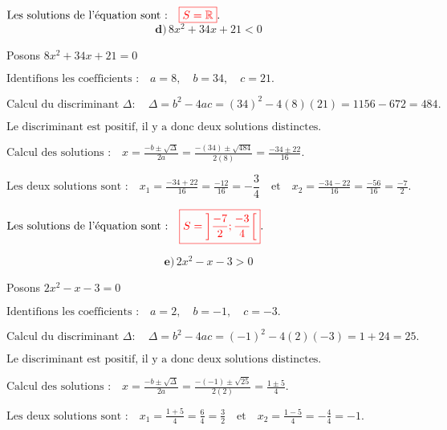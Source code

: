 \documentclass[12pt,a4paper]{article}
\begin{document}
\(
\text{Les solutions de l'équation sont :} \quad
\textcolor{red}{\boxed{S=\mathbb{R} }}.
\)
\\
\[
\textbf{d)} \, 8x^2 + 34x + 21 < 0
\]

Posons \( 8x^2 + 34x + 21 = 0 \)

\(
\text{Identifions les coefficients :} \quad a = 8, \quad b = 34, \quad c = 21.
\)

\(
\text{Calcul du discriminant } \Delta : \quad
\Delta = b^2 - 4ac = (34)^2 - 4(8)(21) = 1156 - 672  = 484.
\)

\(
\text{Le discriminant est positif, il y a donc deux solutions distinctes.}
\)

\(
\text{Calcul des solutions :} \quad
x = \frac{-b \pm \sqrt{\Delta}}{2a} = \frac{-(34) \pm \sqrt{484}}{2(8)} = \frac{-34 \pm 22}{16}.
\)

\(
\text{Les deux solutions sont :} \quad
x_1 = \frac{-34 + 22}{16} = \frac{-12}{16} = -\dfrac{3}{4} \quad \text{et} \quad x_2 = \frac{-34 - 22}{16} = \frac{-56}{16} = \frac{-7}{2}.
\)


\(
\text{Les solutions de l'équation sont :} \quad
\textcolor{red}{\boxed{S=\left]\frac{-7}{2};\frac{-3}{4} \right[ }}.
\)

\[
\textbf{e)} \, 2x^2 - x - 3 > 0
\]

Posons \( 2x^2 - x - 3 = 0 \)

\(
\text{Identifions les coefficients :} \quad a = 2, \quad b = -1, \quad c = -3.
\)

\(
\text{Calcul du discriminant } \Delta : \quad
\Delta = b^2 - 4ac = (-1)^2 - 4(2)(-3) = 1 + 24  = 25.
\)

\(
\text{Le discriminant est positif, il y a donc deux solutions distinctes.}
\)

\(
\text{Calcul des solutions :} \quad
x = \frac{-b \pm \sqrt{\Delta}}{2a} = \frac{-(-1) \pm \sqrt{25}}{2(2)} = \frac{1 \pm 5}{4}.
\)

\(
\text{Les deux solutions sont :} \quad
x_1 = \frac{1 + 5}{4} = \frac{6}{4} = \frac{3}{2} \quad \text{et} \quad x_2 = \frac{1 - 5}{4} = -\frac{4}{4} = -1.
\)

\end{document}
